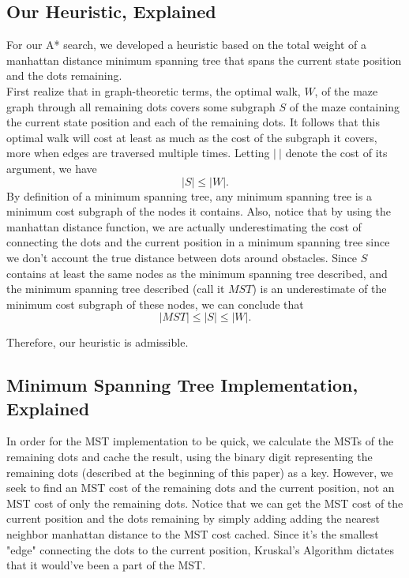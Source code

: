 \documentclass[titlepage]{article}
\begin{document}
\newpage

\subsection*{Our Heuristic, Explained}
For our A* search, we developed a heuristic based on the total weight of a manhattan distance minimum spanning tree that spans the current state position and the dots remaining. \\

\noindent First realize that in graph-theoretic terms, the optimal walk, $W$, of the maze graph through all remaining dots covers some subgraph $S$ of the maze containing the current state position and each of the remaining dots. It follows that this optimal walk will cost at least as much as the cost of the subgraph it covers, more when edges are traversed multiple times. Letting $|\ |$ denote the cost of its argument, we have
$$|S| \le |W|.$$
\noindent By definition of a minimum spanning tree, any minimum spanning tree is a minimum cost subgraph of the nodes it contains. Also, notice that by using the manhattan distance function, we are actually underestimating the cost of connecting the dots and the current position in a minimum spanning tree since we don't account the true distance between dots around obstacles. Since $S$ contains at least the same nodes as the minimum spanning tree described, and the minimum spanning tree described (call it $MST$) is an underestimate of the minimum cost subgraph of these nodes, we can conclude that
$$|MST| \le |S| \le |W|.$$

\noindent Therefore, our heuristic is admissible. 

\subsection*{Minimum Spanning Tree Implementation, Explained}
In order for the MST implementation to be quick, we calculate the MSTs of the remaining dots and cache the result, using the binary digit representing the remaining dots (described at the beginning of this paper) as a key. However, we seek to find an MST cost of the remaining dots and the current position, not an MST cost of only the remaining dots. Notice that we can get the MST cost of the current position and the dots remaining by simply adding adding the nearest neighbor manhattan distance to the MST cost cached. Since it's the smallest "edge" connecting the dots to the current position, Kruskal's Algorithm dictates that it would've been a part of the MST.\\
\end{document}
